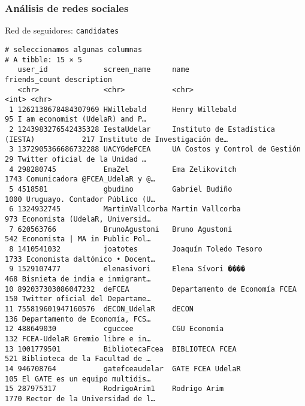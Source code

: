 \documentclass[11pt]{beamer}
\begin{document}
\begin{frame}[fragile]
 \frametitle{Análisis de redes sociales} 
Red de seguidores: \texttt{candidates}
\begin{verbatim}# seleccionamos algunas columnas
# A tibble: 15 × 5
   user_id             screen_name     name                             friends_count description                   
   <chr>               <chr>           <chr>                                    <int> <chr>                         
 1 1262138678484307969 HWillebald      Henry Willebald                             95 I am economist (UdelaR) and P…
 2 1243983276542435328 IestaUdelar     Instituto de Estadística (IESTA)           217 Instituto de Investigación de…
 3 1372905366686732288 UACYGdeFCEA     UA Costos y Control de Gestión              29 Twitter oficial de la Unidad …
 4 298280745           EmaZel          Ema Zelikovitch                           1743 Comunicadora @FCEA_UdelaR y @…
 5 4518581             gbudino         Gabriel Budiño                            1000 Uruguayo. Contador Público (U…
 6 1324932745          MartinVallcorba Martin Vallcorba                           973 Economista (UdelaR, Universid…
 7 620563766           BrunoAgustoni   Bruno Agustoni                             542 Economista | MA in Public Pol…
 8 1410541032          joatotes        Joaquín Toledo Tesoro                     1733 Economista daltónico • Docent…
 9 1529107477          elenasivori     Elena Sívori ����                            468 Bisnieta de india e inmigrant…
10 892037303086047232  deFCEA          Departamento de Economía FCEA              150 Twitter oficial del Departame…
11 755819601947160576  dECON_UdelaR    dECON                                      136 Departamento de Economía, FCS…
12 488649030           cguccee         CGU Economía                               132 FCEA-UdelaR Gremio libre e in…
13 1001779501          BibliotecaFcea  BIBLIOTECA FCEA                            521 Biblioteca de la Facultad de …
14 946708764           gatefceaudelar  GATE FCEA UdelaR                           105 El GATE es un equipo multidis…
15 287975317           RodrigoArim1    Rodrigo Arim                              1770 Rector de la Universidad de l…
    \end{verbatim}
\end{frame}
\end{document}
